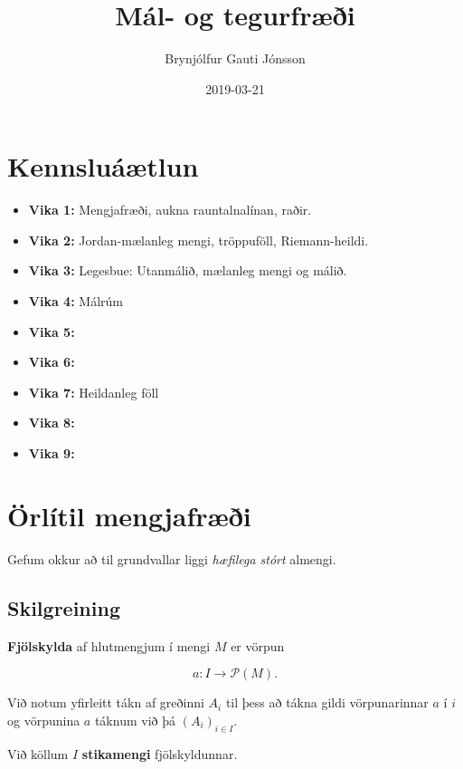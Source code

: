 \documentclass[]{book}
\title{Mál- og tegurfræði}
\author{Brynjólfur Gauti Jónsson}
\date{2019-03-21}
\begin{document}
\maketitle

{
\setcounter{tocdepth}{1}
\tableofcontents
}
\hypertarget{kennsluatlun}{%
\chapter*{Kennsluáætlun}\label{kennsluatlun}}

\begin{itemize}
\item
  \textbf{Vika 1:} Mengjafræði, aukna rauntalnalínan, raðir.
\item
  \textbf{Vika 2:} Jordan-mælanleg mengi, tröppuföll, Riemann-heildi.
\item
  \textbf{Vika 3:} Legesbue: Utanmálið, mælanleg mengi og málið.
\item
  \textbf{Vika 4:} Málrúm
\item
  \textbf{Vika 5:}
\item
  \textbf{Vika 6:}
\item
  \textbf{Vika 7:} Heildanleg föll
\item
  \textbf{Vika 8:}
\item
  \textbf{Vika 9:}
\end{itemize}

\hypertarget{orlitil-mengjafri}{%
\chapter{Örlítil mengjafræði}\label{orlitil-mengjafri}}

Gefum okkur að til grundvallar liggi \emph{hæfilega stórt} almengi.

\hypertarget{skilgreining}{%
\section{Skilgreining}\label{skilgreining}}

\textbf{Fjölskylda} af hlutmengjum í mengi \(M\) er vörpun

\[
a: I\rightarrow \mathcal P(M).
\]

Við notum yfirleitt tákn af greðinni \(A_i\) til þess að tákna gildi vörpunarinnar \(a\) í \(i\) og vörpunina \(a\) táknum við þá \((A_i)_{i\in I}\).

Við köllum \(I\) \textbf{stikamengi} fjölskyldunnar.
\end{document}
